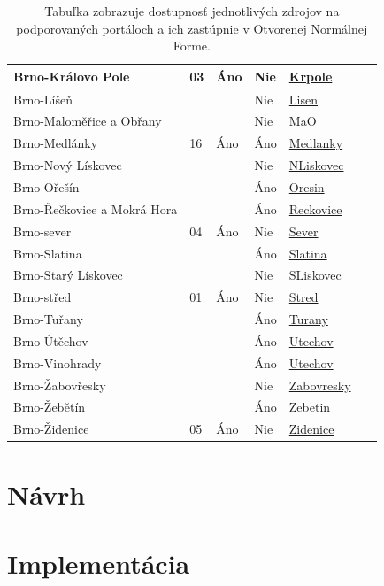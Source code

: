 \begin{table}[H]
\begin{tabular}{|l|l|l|l|l|l|}
        Brno-Královo Pole & 03 & \color{green}Áno & \color{red}Nie & \href{https://kralovopole.brno.cz/uredni-deska/2}{Krpole}& ~ \\ \hline
        Brno-Líšeň & & & \color{red}Nie & \href{https://www.brno-lisen.cz/elektronicka-uredni-deska/s1}{Lisen} & ~ \\ \hline
        Brno-Maloměřice a Obřany & & & \color{red}Nie & \href{https://www.malomerice.cz/uredni-deska/2}{MaO} & ~ \\ \hline
        Brno-Medlánky & 16 & \color{green}Áno & \color{green}Áno & \href{https://edeska.brno.cz//eDeska16/}{Medlanky} & ~ \\ \hline
        Brno-Nový Lískovec & & & \color{red}Nie & \href{https://www.novy-liskovec.cz/uredni-deska/2}{NLiskovec}  & ~ \\ \hline
        Brno-Ořešín & &  & \color{green}Áno & \href{https://www.brno-oresin.cz/uredni-deska.asp}{Oresin}& ~ \\ \hline
        Brno-Řečkovice a Mokrá Hora & & & \color{green}Áno & \href{http://www.udeska.info/deska.php?login=reckovice}{Reckovice}& ~ \\ \hline
        Brno-sever & 04 & \color{green}Áno & \color{red}Nie & \href{https://www.sever.brno.cz/uredni-deska.html}{Sever}& ~ \\ \hline
        Brno-Slatina & & & \color{green}Áno& \href{https://www.mcslatina.cz/uredni-deska}{Slatina} & ~ \\ \hline
        Brno-Starý Lískovec & & & \color{red}Nie & \href{https://www.staryliskovec.cz/cs/urad/uredni-deska-1.html}{SLiskovec} & ~ \\ \hline
        Brno-střed & 01 & \color{green}Áno & \color{red}Nie & \href{https://edeska.brno.cz/eDeska01/}{Stred} & ~ \\ \hline
        Brno-Tuřany & & & \color{green}Áno & \href{https://www.turany.cz/uredni-deska/}{Turany}& ~ \\ \hline
        Brno-Útěchov & & & \color{green}Áno & \href{https://brno-utechov.cz/category/uredni-deska/}{Utechov}& ~ \\ \hline
        Brno-Vinohrady & & & \color{green}Áno & \href{https://www.vinohrady.brno.cz/urad/uredni-deska}{Utechov} & ~ \\ \hline
        Brno-Žabovřesky & & & \color{red}Nie & \href{https://www.zabovresky.cz/uredni-deska/1}{Zabovresky} & ~ \\ \hline
        Brno-Žebětín & & & \color{green}Áno & \href{https://www.zebetin.cz/uredni-deska/2}{Zebetin} & ~ \\ \hline
        Brno-Židenice & 05 & \color{green}Áno & \color{red}Nie & \href{https://edeska.brno.cz/eDeska05/}{Zidenice}& ~ \\ \hline
    \end{tabular}
    \label{MestskeCastiDostupnost}
    \caption{Tabuľka zobrazuje dostupnosť jednotlivých zdrojov na podporovaných portáloch a ich zastúpnie v Otvorenej Normálnej Forme.}
\end{table}

\chapter{Návrh}
\label{Concept}

\chapter{Implementácia}
